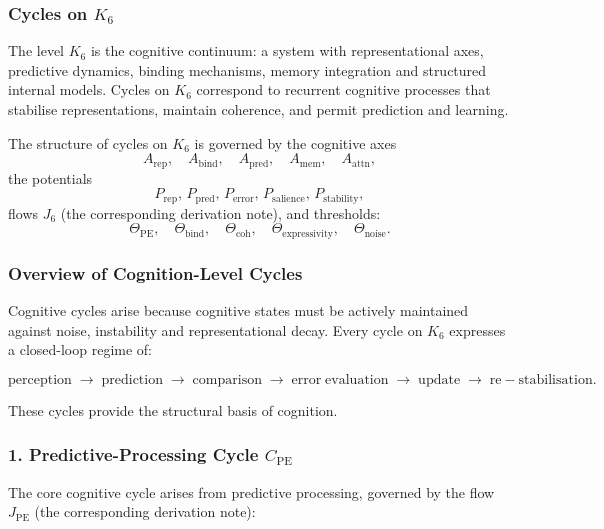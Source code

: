 
\subsubsection{Cycles on \texorpdfstring{$K_6$}{K_6}}
\label{sec:cycles-k6}

The level $K_6$ is the cognitive continuum: a system with representational
axes, predictive dynamics, binding mechanisms, memory integration and
structured internal models.  
Cycles on $K_6$ correspond to recurrent cognitive processes that stabilise
representations, maintain coherence, and permit prediction and learning.

The structure of cycles on $K_6$ is governed by the cognitive axes
\[
 A_{\mathrm{rep}},\quad
 A_{\mathrm{bind}},\quad
 A_{\mathrm{pred}},\quad
 A_{\mathrm{mem}},\quad
 A_{\mathrm{attn}},
\]
the potentials
\[
 P_{\mathrm{rep}},\, P_{\mathrm{pred}},\, P_{\mathrm{error}},\, 
 P_{\mathrm{salience}},\, P_{\mathrm{stability}},
\]
flows $J_6$ (the corresponding derivation note), and thresholds:
\[
 \Theta_{\mathrm{PE}},\quad
 \Theta_{\mathrm{bind}},\quad
 \Theta_{\mathrm{coh}},\quad
 \Theta_{\mathrm{expressivity}},\quad
 \Theta_{\mathrm{noise}}.
\]

\subsubsection{Overview of Cognition-Level Cycles}

Cognitive cycles arise because cognitive states must be actively maintained
against noise, instability and representational decay.  
Every cycle on $K_6$ expresses a closed-loop regime of:

\[
  \mathrm{perception}
  \;\to\;
  \mathrm{prediction}
  \;\to\;
  \mathrm{comparison}
  \;\to\;
  \mathrm{error\;evaluation}
  \;\to\;
  \mathrm{update}
  \;\to\;
  \mathrm{re-stabilisation}.
\]

These cycles provide the structural basis of cognition.

\subsubsection{1. Predictive-Processing Cycle $C_{\mathrm{PE}}$}

The core cognitive cycle arises from predictive processing, governed by
the flow $J_{\mathrm{PE}}$ (the corresponding derivation note):

